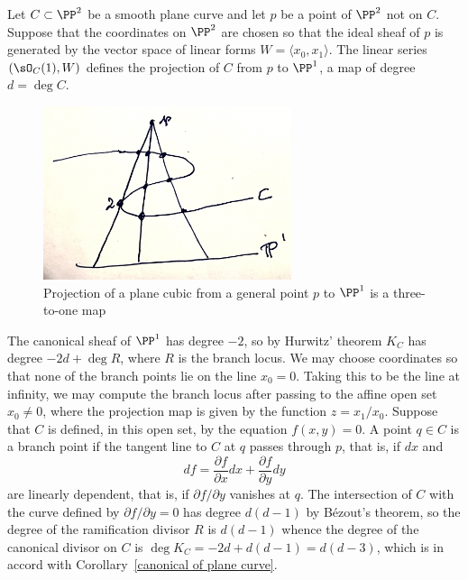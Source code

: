 \begin{example}
Let $C\subset \PP^2$ be a smooth plane curve and let $p$ be a point of $\PP^2$ not on $C$. Suppose that the coordinates on $\PP^2$ are chosen so that the ideal sheaf of $p$ is  
 generated by the vector space of linear forms $W = \langle x_0,x_1\rangle$. 
The linear series $(\sO_C(1), W)$ defines the projection of $C$ from $p$ to $\PP^1$, a map of degree
$d = \deg C$.
\begin{figure}
 \caption{Projection of a plane cubic from a general point $p$ to $\PP^1$ is a three-to-one map}
\centerline {\includegraphics[height=2in]{"projectionPlaneCubic"}}
\end{figure}

The canonical sheaf of $\PP^1$ has degree $-2$, so by Hurwitz' theorem
$K_C$ has degree $ -2d+ \deg R$, where $R$ is the branch locus. We may choose coordinates
so that none of the branch points lie on the line $x_0 = 0$. Taking this to be the line at infinity, we
may compute the branch locus after passing to the affine open set $x_0\neq 0$, where the projection
map is given by the function $z = x_1/x_0$.  Suppose that $C$ is defined, in this open set,
by the equation $f(x,y)= 0$. A point $q\in C$ is a branch point if the tangent line to $C$ at $q$
passes through $p$, that is, if $dx$  and 
$$
df = \frac{\partial f}{\partial x} dx + \frac{\partial f}{\partial y} dy
$$
are linearly dependent, that is, if $\partial f/{\partial y}$ vanishes at $q$. The intersection of 
$C$ with the curve defined by $\partial f/{\partial y}=0$ has degree $d(d-1)$ by B\'ezout's theorem,
so the degree of the ramification divisor $R$ is $d(d-1)$ whence the degree of the canonical
divisor on $C$ is $\deg K_C = -2d+d(d-1) = d(d-3)$, which is in accord with 
Corollary~\ref{canonical of plane curve}.

\end{example}

